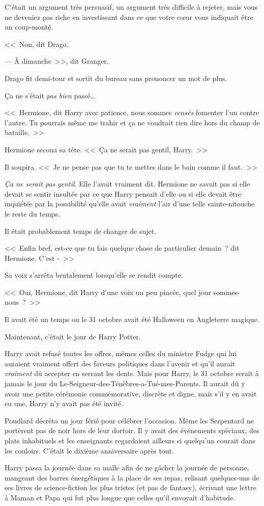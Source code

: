 C'était un argument très persuasif, un argument très difficile à rejeter, mais vous ne deveniez pas riche en investissant dans ce que votre cœur vous indiquait être un coup-monté.

<<~Non, dit Drago.

--- À dimanche~>>, dit Granger.

Drago fit demi-tour et sortit du bureau sans prononcer un mot de plus.

Ça ne s'était \emph{pas bien} passé…

\later

<<~Hermione, dit Harry avec patience, nous sommes \emph{censés} fomenter l'un contre l'autre. Tu pourrais même me trahir et ça ne voudrait rien dire hors du champ de bataille.~>>

Hermione secoua sa tête. <<~Ça ne serait pas gentil, Harry.~>>

Il soupira. <<~Je ne pense pas que tu te mettes dans le bain comme il faut.~>>

\emph{Ça ne serait pas gentil}. Elle l'avait vraiment dit. Hermione ne savait pas si elle devait se sentir insultée par ce que Harry pensait d'elle ou si elle devait être inquiétée par la possibilité qu'elle avait \emph{vraiment} l'air d'une telle sainte-nitouche le reste du temps.

Il était probablement temps de changer de sujet.

<<~Enfin bref, est-ce que tu fais quelque chose de particulier demain~? dit Hermione. C'est -~>>

Sa voix s'arrêta brutalement lorsqu'elle se rendit compte.

<<~Oui, Hermione, dit Harry d'une voix un peu pincée, quel jour sommes-nous~?~>>


Il avait été un temps ou le 31 octobre avait été Halloween en Angleterre magique.

Maintenant, c'était le jour de Harry Potter.

Harry avait refusé toutes les offres, mêmes celles du ministre Fudge qui lui auraient vraiment offert des faveurs politiques dans l'avenir et qu'il aurait \emph{vraiment} dû accepter en serrant les dents. Mais pour Harry, le 31 octobre serait à jamais le jour du Le-Seigneur-des-Ténèbres-a-Tué-mes-Parents. Il aurait dû y avoir une petite cérémonie commémorative, discrète et digne, mais s'il y en avait eu une, Harry n'y avait pas été invité.

Poudlard décréta un jour férié pour célébrer l'occasion. Même les Serpentard ne portèrent pas de noir hors de leur dortoir. Il y avait des événements spéciaux, des plats inhabituels et les enseignants regardaient ailleurs si quelqu'un courait dans les couloirs. C'était le dixième anniversaire après tout.

Harry passa la journée dans sa malle afin de ne gâcher la journée de personne, mangeant des barres énergétiques à la place de ses repas, relisant quelques-uns de ses livres de science-fiction les plus tristes (et pas de fantasy), écrivant une lettre à Maman et Papa qui fut plus longue que celles qu'il envoyait d'habitude.

